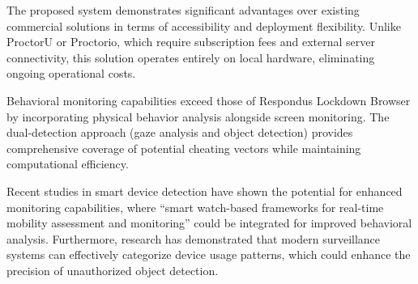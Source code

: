 \documentclass[conference]{IEEEtran}
\begin{document}
The proposed system demonstrates significant advantages over existing commercial solutions 
in terms of accessibility and deployment flexibility. Unlike ProctorU or Proctorio, which 
require subscription fees and external server connectivity\cite{proctoru}\cite{proctorio}, 
this solution operates entirely on local hardware, eliminating ongoing operational costs.

Behavioral monitoring capabilities exceed those of Respondus Lockdown Browser by incorporating 
physical behavior analysis alongside screen monitoring\cite{respondus}. The dual-detection 
approach (gaze analysis and object detection) provides comprehensive coverage of potential 
cheating vectors while maintaining computational efficiency.

Recent studies in smart device detection have shown the potential for enhanced monitoring 
capabilities, where ``smart watch-based frameworks for real-time mobility assessment and 
monitoring'' could be integrated for improved behavioral analysis\cite{kheirkhahan2018smartwatch}. 
Furthermore, research has demonstrated that modern surveillance systems can effectively 
categorize device usage patterns, which could enhance the precision of unauthorized object 
detection\cite{moshawrab2023value}.
\end{document}
